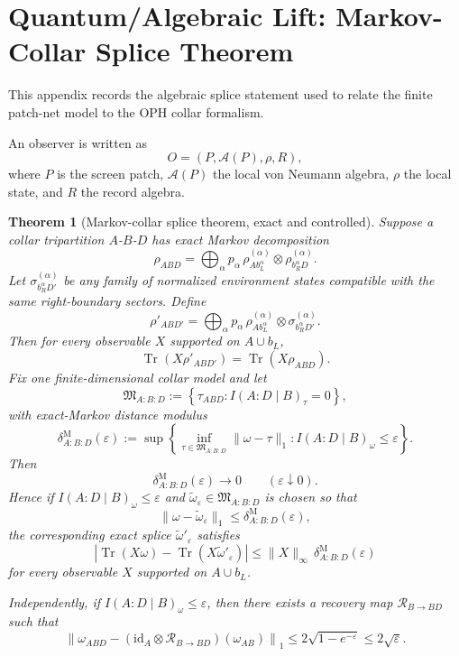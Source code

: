 \documentclass[11pt]{article}
\newtheorem{theorem}{Theorem}[section]
\theoremstyle{remark}
\theoremstyle{plain}
\begin{document}
\appendix
\section{Quantum/Algebraic Lift: Markov-Collar Splice Theorem}\label{app:splice}

This appendix records the algebraic splice statement used to relate the finite patch-net model to
the OPH collar formalism.

An observer is written as
\[
O=(P,\mathcal{A}(P),\rho,R),
\]
where $P$ is the screen patch, $\mathcal{A}(P)$ the local von Neumann algebra, $\rho$ the local state, and $R$ the record algebra.

\begin{theorem}[Markov-collar splice theorem, exact and controlled]\label{thm:splice}
Suppose a collar tripartition $A$-$B$-$D$ has exact Markov decomposition
\[
\rho_{ABD}
=
\bigoplus_{\alpha}
p_\alpha\,
\rho^{(\alpha)}_{A b_L^\alpha}
\otimes
\rho^{(\alpha)}_{b_R^\alpha D}.
\]
Let $\sigma_{b_R^\alpha D'}^{(\alpha)}$ be any family of normalized environment states compatible with the same right-boundary sectors. Define
\[
\rho'_{AB D'}
=
\bigoplus_{\alpha}
p_\alpha\,
\rho^{(\alpha)}_{A b_L^\alpha}
\otimes
\sigma_{b_R^\alpha D'}^{(\alpha)}.
\]
Then for every observable $X$ supported on $A\cup b_L$,
\[
\operatorname{Tr}(X\rho'_{AB D'})
=
\operatorname{Tr}(X\rho_{ABD}).
\]
Fix one finite-dimensional collar model and let
\[
\mathfrak M_{A:B:D}
:=
\left\{
\tau_{ABD}: I(A:D\mid B)_\tau=0
\right\},
\]
with exact-Markov distance modulus
\[
\delta^{\mathrm M}_{A:B:D}(\varepsilon)
:=
\sup\left\{
\inf_{\tau\in\mathfrak M_{A:B:D}}\|\omega-\tau\|_1:
I(A:D\mid B)_\omega\le\varepsilon
\right\}.
\]
Then
\[
\delta^{\mathrm M}_{A:B:D}(\varepsilon)\to0
\qquad
(\varepsilon\downarrow0).
\]
Hence if \(I(A:D\mid B)_\omega\le \varepsilon\) and \(\widetilde\omega_\varepsilon\in\mathfrak M_{A:B:D}\) is chosen so that
\[
\|\omega-\widetilde\omega_\varepsilon\|_1
\le
\delta^{\mathrm M}_{A:B:D}(\varepsilon),
\]
the corresponding exact splice \(\widetilde\omega'_\varepsilon\) satisfies
\[
\left|
\operatorname{Tr}(X\omega)-\operatorname{Tr}(X\widetilde\omega'_\varepsilon)
\right|
\le
\|X\|_\infty\,
\delta^{\mathrm M}_{A:B:D}(\varepsilon)
\]
for every observable \(X\) supported on \(A\cup b_L\).

Independently, if \(I(A:D\mid B)_\omega\le \varepsilon\), then there exists a recovery map \(\mathcal R_{B\to BD}\) such that
\[
\left\|
\omega_{ABD}
-
(\mathrm{id}_A\otimes \mathcal R_{B\to BD})(\omega_{AB})
\right\|_1
\le
2\sqrt{1-e^{-\varepsilon}}
\le
2\sqrt{\varepsilon}.
\]
\end{theorem}
\end{document}
